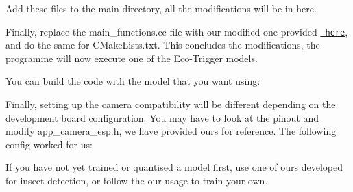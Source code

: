 \begin{adjustwidth}{1em}{0em}
Add these files to the {\ttfamily main} directory, all the modifications will be in here.

Finally, replace the {\ttfamily main\+\_\+functions.\+cc} file with our modified one provided \href{./esp32s3}{\texttt{ here}}, and do the same for {\ttfamily CMake\+Lists.\+txt}. This concludes the modifications, the programme will now execute one of the Eco-\/\+Trigger models.

You can build the code with the model that you want using\+: 
\begin{DoxyCode}{0}

\end{DoxyCode}
 Finally, setting up the camera compatibility will be different depending on the development board configuration. You may have to look at the pinout and modify {\ttfamily app\+\_\+camera\+\_\+esp.\+h}, we have provided ours for reference. The following config worked for us\+: 
\begin{DoxyCode}{0}
\DoxyCodeLine{}
\DoxyCodeLine{}
\DoxyCodeLine{}

\end{DoxyCode}
 \end{adjustwidth}


If you have not yet trained or quantised a model first, use one of ours developed for insect detection, or follow the our usage  to train your own. 